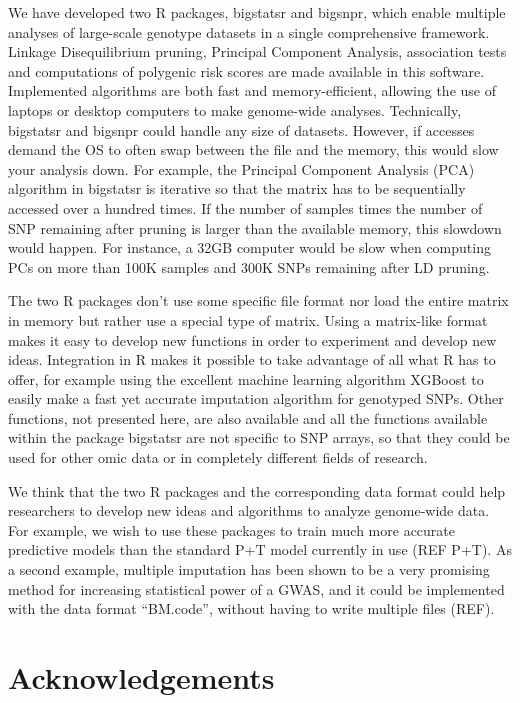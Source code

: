 \documentclass{bioinfo}
\begin{document}
We have developed two R packages, bigstatsr and bigsnpr, which enable multiple analyses of large-scale genotype datasets in a single comprehensive framework. Linkage Disequilibrium pruning, Principal Component Analysis, association tests and computations of polygenic risk scores are made available in this software. Implemented algorithms are both fast and memory-efficient, allowing the use of laptops or desktop computers to make genome-wide analyses. Technically, bigstatsr and bigsnpr could handle any size of datasets. However, if accesses demand the OS to often swap between the file and the memory, this would slow your analysis down. For example, the Principal Component Analysis (PCA) algorithm in bigstatsr is iterative so that the matrix has to be sequentially accessed over a hundred times. If the number of samples times the number of SNP remaining after pruning is larger than the available memory, this slowdown would happen. For instance, a 32GB computer would be slow when computing PCs on more than 100K samples and 300K SNPs remaining after LD pruning.

The two R packages don't use some specific file format nor load the entire matrix in memory but rather use a special type of matrix. Using a matrix-like format makes it easy to develop new functions in order to experiment and develop new ideas. Integration in R makes it possible to take advantage of all what R has to offer, for example using the excellent machine learning algorithm XGBoost to easily make a fast yet accurate imputation algorithm for genotyped SNPs. Other functions, not presented here, are also available and all the functions available within the package bigstatsr are not specific to SNP arrays, so that they could be used for other omic data or in completely different fields of research.

We think that the two R packages and the corresponding data format could help researchers to develop new ideas and algorithms to analyze genome-wide data. For example, we wish to use these packages to train much more accurate predictive models than the standard P+T model currently in use (REF P+T). As a second example, multiple imputation has been shown to be a very promising method for increasing statistical power of a GWAS, and it could be implemented with the data format ``BM.code'', without having to write multiple files (REF).



\section*{Acknowledgements}
\end{document}
